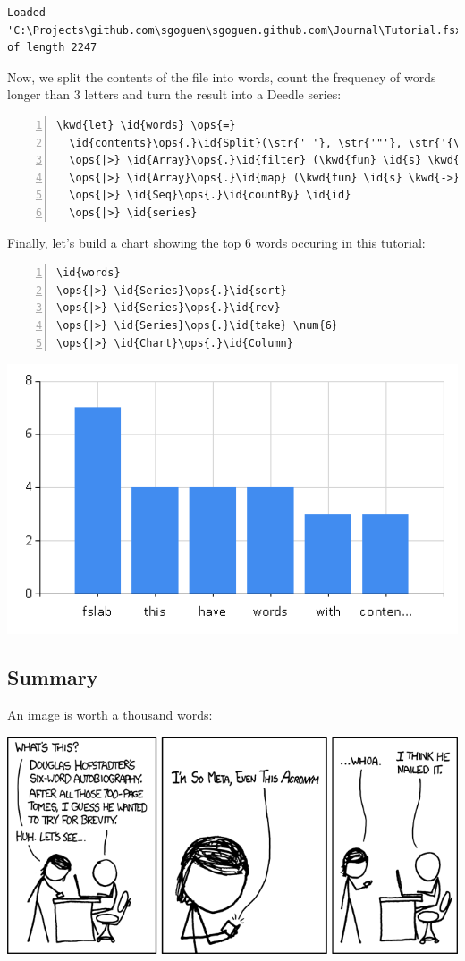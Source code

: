 \documentclass{article}
\newcommand{\id}[1]{\textcolor{black}{#1}}
\newcommand{\kwd}[1]{\textcolor{navy}{#1}}
\newcommand{\num}[1]{\textcolor{officegreen}{#1}}
\newcommand{\ops}[1]{\textcolor{purple}{#1}}
\newcommand{\str}[1]{\textcolor{olive}{#1}}
\begin{document}
\begin{lstlisting}
Loaded 'C:\Projects\github.com\sgoguen\sgoguen.github.com\Journal\Tutorial.fsx' of length 2247
\end{lstlisting}



Now, we split the contents of the file into words, count the frequency of 
words longer than 3 letters and turn the result into a Deedle series:
\begin{Verbatim}[commandchars=\\\{\}, numbers=left]
\kwd{let} \id{words} \ops{=} 
  \id{contents}\ops{.}\id{Split}(\str{' '}, \str{'"'}, \str{'{\textbackslash}n'}, \str{'{\textbackslash}r'}, \str{'*'})
  \ops{|>} \id{Array}\ops{.}\id{filter} (\kwd{fun} \id{s} \kwd{->} \id{s}\ops{.}\id{Length} \ops{>} \num{3})
  \ops{|>} \id{Array}\ops{.}\id{map} (\kwd{fun} \id{s} \kwd{->} \id{s}\ops{.}\id{ToLower}())
  \ops{|>} \id{Seq}\ops{.}\id{countBy} \id{id}
  \ops{|>} \id{series}
\end{Verbatim}



Finally, let's build a chart showing the top 6 words occuring in this tutorial:
\begin{Verbatim}[commandchars=\\\{\}, numbers=left]
\id{words} 
\ops{|>} \id{Series}\ops{.}\id{sort}
\ops{|>} \id{Series}\ops{.}\id{rev}
\ops{|>} \id{Series}\ops{.}\id{take} \num{6}
\ops{|>} \id{Chart}\ops{.}\id{Column}
\end{Verbatim}



\includegraphics[width=1.0\textwidth]{./images/chart1.png}

\subsection*{Summary}



An image is worth a thousand words:


\includegraphics[width=1.0\textwidth]{./savedimages/saved1.png}
\end{document}
